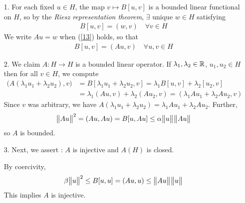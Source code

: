 \documentclass[10pt,a4paper]{report}
\newenvironment{proof}
{\begin{changemargin}{1cm}{0.5cm} 
	}%
	{\end{changemargin}
}
\newenvironment{subproof}
{\begin{changemargin}{0.5cm}{0.5cm} 
	}%
	{\end{changemargin}
}
\begin{document}
\begin{proof}
\pf \begin{itemize}
\item[1.] For each fixed $u\in H$, the map $v\mapsto B[u,v]$ is a bounded linear functional on $H$, so by the \emph{Riesz representation theorem}, $\exists$ unique $w\in H$ satisfying
\begin{align}
B[u,v] = (w, v) \quad \forall v \in H \label{13}
\end{align}
We write $Au =w$ when (\ref{13}) holds, so that
\begin{align*}
B[u,v] = (Au,v) \quad \forall u,v\in H
\end{align*}
\item[2.] We claim $A: H\rightarrow H$ is a bounded linear operator. If $\lambda_1, \lambda_2 \in \mathbb{R}$, $u_1, u_2 \in H$ then for all $v\in H$, we compute
\begin{align*}
\big( A(\lambda_1 u_1 + \lambda_2 u_2), v \big) &= B[\lambda_1 u_1 + \lambda_2 u_2, v] = \lambda_1 B[u,v] + \lambda_2[u_2,v] \\
& = \lambda_1(Au,v) + \lambda_2 (Au_2, v) = (\lambda_1 Au_1 + \lambda_2 Au_2, v)
\end{align*}
Since $v$ was arbitrary, we have $A(\lambda_1 u_1 + \lambda_2 u_2) = \lambda_1 A u_1 + \lambda_2 Au_2$. Further,
\begin{align*}
\bigl\lVert A u\bigr\rVert_{}^2 = (Au, Au) = B[u,Au] \leq \alpha \bigl\lVert u\bigr\rVert_{} \bigl\lVert Au\bigr\rVert_{}
\end{align*}
so $A$ is bounded.
\item[3.] Next, we assert : $A$ is injective and $A(H)$ is closed.
\begin{subproof}
\pf By coercivity, 
\begin{align*}
\beta \bigl\lVert u\bigr\rVert_{}^2 \leq B[u,u] = (Au,u) \leq \bigl\lVert Au\bigr\rVert_{} \bigl\lVert u\bigr\rVert_{}
\end{align*}
This implies $A$ is injective.


\end{subproof}
\end{itemize}
\end{proof}
\end{document}

